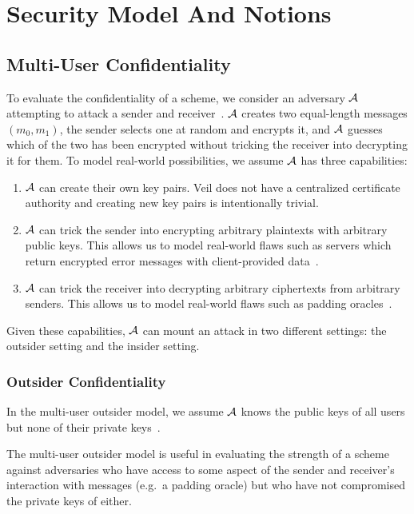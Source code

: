 \section{Security Model And Notions}\label{sec:security-model-and-notions}

\subsection{Multi-User Confidentiality}\label{subsec:sec-conf}

To evaluate the confidentiality of a scheme, we consider an adversary $\mathcal{A}$ attempting to attack a sender and
receiver~\cite[p. 44]{baek2010}\@.
$\mathcal{A}$ creates two equal-length messages $(m_0, m_1)$, the sender selects one at random and encrypts it, and
$\mathcal{A}$ guesses which of the two has been encrypted without tricking the receiver into decrypting it for them.
To model real-world possibilities, we assume $\mathcal{A}$ has three capabilities:

\begin{enumerate}
    \item $\mathcal{A}$ can create their own key pairs.
    Veil does not have a centralized certificate authority and creating new key pairs is intentionally trivial.
    \item $\mathcal{A}$ can trick the sender into encrypting arbitrary plaintexts with arbitrary public keys.
    This allows us to model real-world flaws such as servers which return encrypted error messages with client-provided
    data~\cite{yu2004}\@.
    \item $\mathcal{A}$ can trick the receiver into decrypting arbitrary ciphertexts from arbitrary senders.
    This allows us to model real-world flaws such as padding oracles~\cite{rizzo2010practical}\@.
\end{enumerate}

Given these capabilities, $\mathcal{A}$ can mount an attack in two different settings: the outsider setting and the
insider setting.

\subsubsection{Outsider Confidentiality}\label{subsubsec:sec-conf-outsider}

In the multi-user outsider model, we assume $\mathcal{A}$ knows the public keys of all users but none of their private
keys~\cite[p. 44]{baek2010}\@.

The multi-user outsider model is useful in evaluating the strength of a scheme against adversaries who have access to
some aspect of the sender and receiver's interaction with messages \@(e.g.\ a padding oracle) but who have not compromised
the private keys of either.

